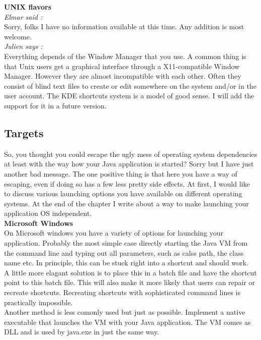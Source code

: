\textbf{UNIX flavors}\\

\textit{Elmar said :}\\
Sorry, folks I have no information available at this time.
Any addition is most welcome.\\

\textit{Julien says :}\\
Everything depends of the Window Manager that you use. A common thing is that
Unix users get a graphical interface through a X11-compatible Window Manager.
However they are almost incompatible with each other. Often they consist of
blind text files to create or edit somewhere on the system and/or in the user
account. The KDE shortcuts system is a model of good sense. I will add the
support for it in a future \IzPack version.\\

\subsection{Targets}

So, you thought you could escape the ugly mess of operating system
dependencies at least with the way how your Java application is started?
Sorry but I have just another bad message. The one positive thing is
that here you have a way of escaping, even if doing so has a few less
pretty side effects. At first, I would like to discuss various launching
options you have available on different operating systems. At the end of
the chapter I write about a way to make launching your application OS
independent.\\

\textbf{Microsoft Windows}\\

On Microsoft windows you have a variety of options for launching your
application. Probably the most simple case directly starting the Java VM
from the command line and typing out all parameters, such as calss path,
the class name etc. In principle, this can be stuck right into a
shortcut and should work.\\

A little more elagant solution is to place this in a batch file and have
the shortcut point to this batch file. This will also make it more
likely that users can repair or recreate shortcuts. Recreating shortcuts
with sophisticated command lines is practically impossible.\\

Another method is less comonly used but just as possible. Implement a
native executable that launches the VM with your Java application. The
VM comes as DLL and is used by java.exe in just the same way.\\

